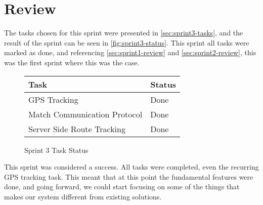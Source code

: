 \section{Review}
\label{sec:sprint3-review}

The tasks chosen for this sprint were presented in \autoref{sec:sprint3-tasks}, and the result of the sprint can be seen in \autoref{fig:sprint3-status}. This sprint all tasks were marked as done, and referencing \autoref{sec:sprint1-review} and \autoref{sec:sprint2-review}, this was the first sprint where this was the case.

\begin{figure}[ht!]
 \caption{Sprint 3 Task Status}
 \label{fig:sprint3-status}
 \begin{tabular}{|l|l|}
  \hline
  \textbf{Task} & \textbf{Status} \\
  \hline
  \ac{GPS} Tracking & Done \\
  \hline
  Match Communication Protocol & Done \\
  \hline
  Server Side Route Tracking & Done \\
  \hline
 \end{tabular}
\end{figure}

This sprint was considered a success. All tasks were completed, even the recurring \ac{GPS} tracking task. This meant that at this point the fundamental features were done, and going forward, we could start focusing on some of the things that makes our system different from existing solutions.
